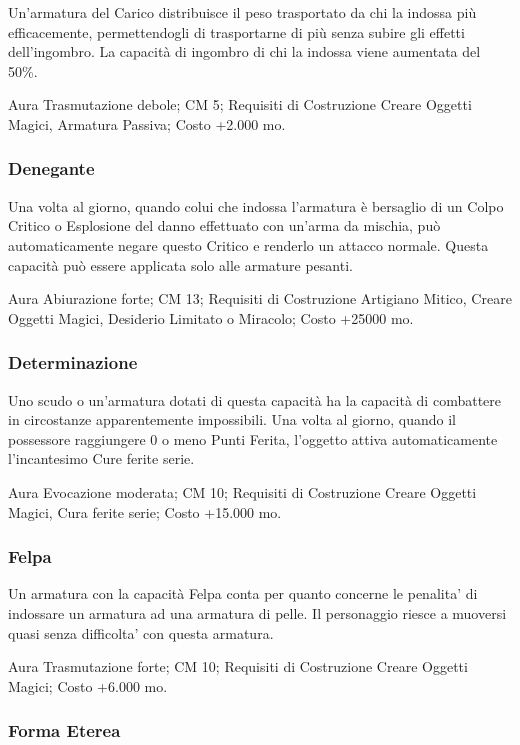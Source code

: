 \begin{multicols}{2}
Un'armatura del Carico distribuisce il peso trasportato da chi la indossa più efficacemente, permettendogli di trasportarne di più senza subire gli effetti dell'ingombro. La capacità di ingombro di chi la indossa viene aumentata del 50\%.

Aura Trasmutazione debole; CM 5; Requisiti di Costruzione Creare Oggetti Magici, Armatura Passiva; Costo +2.000 mo.

\subsubsection{Denegante}

Una volta al giorno, quando colui che indossa l'armatura è bersaglio di un Colpo Critico o Esplosione del danno effettuato con un'arma da mischia, può automaticamente negare questo Critico e renderlo un attacco normale. Questa capacità può essere applicata solo alle armature pesanti.

Aura Abiurazione forte; CM 13; Requisiti di Costruzione Artigiano Mitico, Creare Oggetti Magici, Desiderio Limitato o Miracolo; Costo +25000 mo.

\subsubsection{Determinazione}

Uno scudo o un'armatura dotati di questa capacità ha la capacità di combattere in circostanze apparentemente impossibili. Una volta al giorno, quando il possessore raggiungere 0 o meno Punti Ferita, l'oggetto attiva automaticamente l'incantesimo Cure ferite serie.

Aura Evocazione moderata; CM 10; Requisiti di Costruzione Creare Oggetti Magici, Cura ferite serie; Costo +15.000 mo.

\subsubsection{Felpa}

Un armatura con la capacità Felpa conta per quanto concerne le penalita' di indossare un armatura ad una armatura di pelle. Il personaggio riesce a muoversi quasi senza difficolta' con questa armatura.

Aura Trasmutazione forte; CM 10; Requisiti di Costruzione Creare Oggetti Magici; Costo +6.000 mo.

\subsubsection{Forma Eterea}


\end{multicols}
